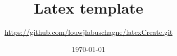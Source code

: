 \documentclass[10pt]{article}
\title{Latex template}
\author{\url{https://github.com/louwjlabuschagne/latexCreate.git}}
\date{\today}
\begin{document}
\maketitle
\cite{latex2017}
\setcounter{tocdepth}{2} 
\tableofcontents \newpage


\appendix

\label{Bibliography}

\end{document}
